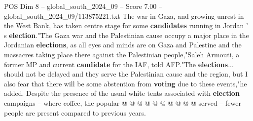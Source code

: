 \begin{textsample}{POS Dim 8 – global\_south\_2024\_09 – Score 7.00 – global\_south\_2024\_09/113875221.txt}
The war in Gaza, and growing unrest in the West Bank, has taken centre stage for some \textbf{candidates} running in Jordan ' s \textbf{election}."The Gaza war and the Palestinian cause occupy a major place in the Jordanian \textbf{elections}, as all eyes and minds are on Gaza and Palestine and the massacres taking place there against the Palestinian people,"Saleh Armouti, a former MP and current \textbf{candidate} for the IAF, told AFP."The \textbf{elections}... should not be delayed and they serve the Palestinian cause and the region, but I also fear that there will be some abstention from \textbf{voting} due to these events,"he added.
Despite the presence of the usual white tents associated with \textbf{election} campaigns -- where coffee, the popular @ @ @ @ @ @ @ @ @ @ served -- fewer people are present compared to previous years.

\end{textsample}
